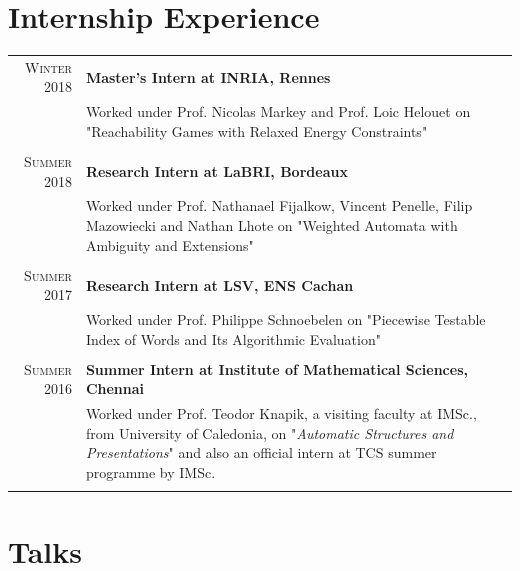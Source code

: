 \documentclass[a4paper,10pt]{article}
\begin{document}
\section{Internship Experience}
\begin{longtable}{r|p{11cm}}

\textsc {Winter 2018} & \textbf {Master's Intern at INRIA, Rennes}\\
& Worked under Prof. Nicolas Markey and Prof. Loic Helouet  on "Reachability Games with Relaxed Energy Constraints"\\&\\


\textsc {Summer 2018} & \textbf {Research Intern at LaBRI, Bordeaux}\\
& Worked under Prof. Nathanael Fijalkow, Vincent Penelle, Filip Mazowiecki and Nathan Lhote  on "Weighted Automata with Ambiguity and Extensions"\\&\\

\textsc {Summer 2017} & \textbf {Research Intern at LSV, ENS Cachan}\\
& Worked under Prof. Philippe Schnoebelen  on "Piecewise Testable Index of Words
and Its Algorithmic Evaluation"\\&\\

 \textsc {Summer 2016} & \textbf {Summer Intern at Institute of Mathematical Sciences, Chennai}\\
& Worked under Prof. Teodor Knapik, a visiting faculty at IMSc., from University of Caledonia, on "\emph{Automatic Structures and Presentations}" and also an official intern at TCS summer programme by IMSc.\\&\\

\end{longtable}

\section{Talks}
\end{document}

